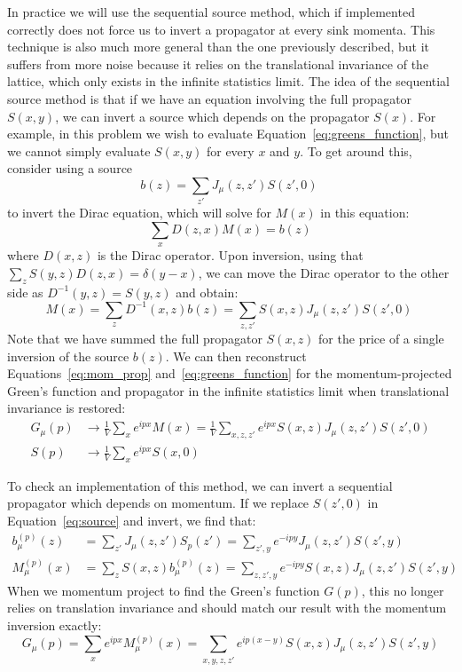 \documentclass[11pt, oneside]{article}   	%
\theoremstyle{definition}
\begin{document}
In practice we will use the sequential source method, which if implemented correctly does not force us to invert a propagator 
at every sink momenta. This technique is also much more general than the one previously described, but it suffers from 
more noise because it relies on the translational invariance of the lattice, which only exists in the infinite statistics 
limit. The idea of the sequential source method is that if we have an equation involving the full propagator $S(x, y)$, we can 
invert a source which depends on the propagator $S(x)$. For example, in this problem we wish to evaluate 
Equation~\ref{eq:greens_function}, but we cannot simply evaluate $S(x, y)$ for every $x$ and $y$. To get around this, 
consider using a source
\begin{equation}
	b(z) = \sum_{z'} J_\mu(z, z') S(z', 0)~
	\label{eq:source}
\end{equation}
to invert the Dirac equation, which will solve for $M(x)$ in this equation:
\begin{equation}
	\sum_x D(z, x) M(x) = b(z)
\end{equation} 
where $D(x, z)$ is the Dirac operator. Upon inversion, using that $\sum_z S(y, z) D(z, x) = \delta(y - x)$, we can move the 
Dirac operator to the other side as $D^{-1}(y, z) = S(y, z)$ and obtain:
\begin{equation}
	M(x) = \sum_z D^{-1}(x, z) b(z) = \sum_{z, z'} S(x, z) J_\mu(z, z') S(z', 0)~
	\label{eq:inversion}
\end{equation}
Note that we have summed the full propagator $S(x, z)$ for the price of a single inversion of the source $b(z)$. We can then 
reconstruct Equations~\ref{eq:mom_prop} and~\ref{eq:greens_function} for the momentum-projected Green's function 
and propagator in the infinite statistics limit when translational invariance is restored:
\begin{align}
	G_\mu(p)&\rightarrow \frac{1}{V} \sum_x e^{ipx} M(x) = \frac{1}{V} \sum_{x, z, z'} e^{ipx} S(x, z) J_\mu(z, z') S(z', 0) \\
		S(p)&\rightarrow\frac{1}{V}\sum_x e^{ipx} S(x, 0)
\end{align}

To check an implementation of this method, we can invert a sequential propagator which depends on momentum. If we 
replace $S(z', 0)$ in Equation~\ref{eq:source} and invert, we find that:
\begin{align}
	b_\mu^{(p)}(z) &= \sum_{z'} J_\mu(z, z') S_p(z') = \sum_{z', y} e^{-ipy} J_\mu(z, z') S(z', y) \\
	M_\mu^{(p)}(x) &= \sum_{z} S(x, z) b_\mu^{(p)}(z) = \sum_{z, z', y} e^{-ipy} S(x, z) J_\mu(z, z') S(z', y)
\end{align}
When we momentum project to find the Green's function $G(p)$, this no longer relies on translation invariance and should 
match our result with the momentum inversion exactly:
\begin{equation}
	G_\mu(p) = \sum_x e^{ipx} M_\mu^{(p)}(x) = \sum_{x, y, z, z'} e^{ip(x - y)} S(x, z) J_\mu(z, z') S(z', y)
\end{equation}
\end{document}

